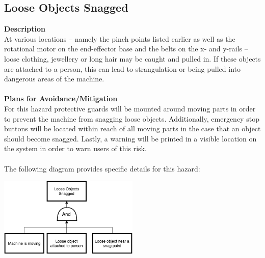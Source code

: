 \documentclass[titlepage]{article}
\begin{document}
\subsection{Loose Objects Snagged}
\textbf{Description}\\
At various locations -- namely the pinch points listed earlier as well as the rotational motor on the end-effector base and the belts on the x- and y-rails -- loose clothing, jewellery or long hair may be caught and pulled in. If these objects are attached to a person, this can lead to strangulation or being pulled into dangerous areas of the machine.\\~\\
\textbf{Plans for Avoidance/Mitigation}\\
For this hazard protective guards will be mounted around moving parts in order to prevent the machine from snagging loose objects. Additionally, emergency stop buttons will be located within reach of all moving parts in the case that an object should become snagged. Lastly, a warning will be printed in a visible location on the system in order to warn users of this risk.\\~\\
The following diagram provides specific details for this hazard:
\begin{center}
	\includegraphics[width=0.5\textwidth]{LooseObjectFTA.png}
\label{fig:yRailFig}
\end{center}

\newpage
\end{document}
